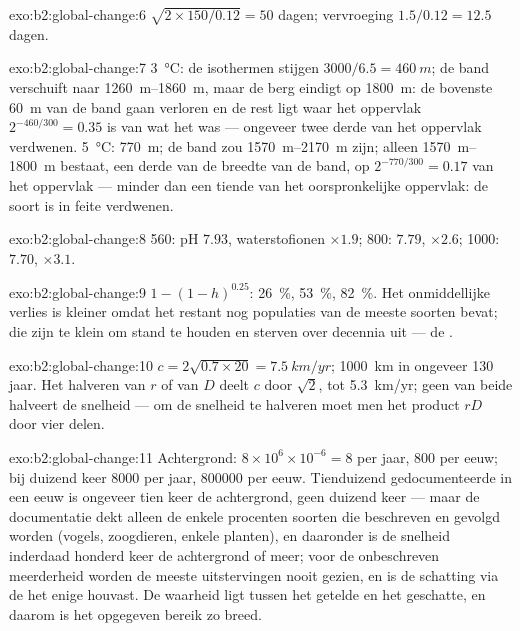 \begin{solution}{exo:b2:global-change:6}
$\sqrt{2\times 150/0.12} = 50$ dagen; vervroeging $1.5/0.12 = 12.5$
dagen.
\end{solution}

\begin{solution}{exo:b2:global-change:7}
\qty{3}{\celsius}: de isothermen stijgen $3000/6.5 = \qty{460}{m}$; de
band verschuift naar \qtyrange{1260}{1860}{m}, maar de berg eindigt op
\qty{1800}{m}: de bovenste \qty{60}{m} van de band gaan verloren en de rest
ligt waar het oppervlak $2^{-460/300} = 0.35$ is van wat het was --- ongeveer
twee derde van het oppervlak verdwenen. \qty{5}{\celsius}: \qty{770}{m}; de
band zou \qtyrange{1570}{2170}{m} zijn; alleen \qtyrange{1570}{1800}{m}
bestaat, een derde van de breedte van de band, op $2^{-770/300} = 0.17$ van het
oppervlak --- minder dan een tiende van het oorspronkelijke oppervlak: de soort
is in feite verdwenen.
\end{solution}

\begin{solution}{exo:b2:global-change:8}
560: pH $7.93$, waterstofionen $\times 1.9$; 800: $7.79$, $\times
2.6$; 1000: $7.70$, $\times 3.1$.
\end{solution}

\begin{solution}{exo:b2:global-change:9}
$1 - (1 - h)^{0.25}$: \qty{26}{\%}, \qty{53}{\%}, \qty{82}{\%}. Het
onmiddellijke verlies is kleiner omdat het restant nog populaties van de
meeste soorten bevat; die zijn te klein om stand te houden en
sterven over decennia uit --- de .
\end{solution}

\begin{solution}{exo:b2:global-change:10}
$c = 2\sqrt{0.7\times 20} = \qty{7.5}{km/yr}$; \qty{1000}{km} in
ongeveer 130 jaar. Het halveren van $r$ of van $D$ deelt $c$ door
$\sqrt 2$, tot \qty{5.3}{km/yr}; geen van beide halveert de snelheid --- om de
snelheid te halveren moet men het product $rD$ door vier delen.
\end{solution}

\begin{solution}{exo:b2:global-change:11}
Achtergrond: $8\times 10^{6}\times 10^{-6} = 8$ per jaar, 800 per
eeuw; bij duizend keer 8000 per jaar, \num{800000} per eeuw.
Tienduizend gedocumenteerde in een eeuw is ongeveer tien keer de
achtergrond, geen duizend keer --- maar de documentatie dekt alleen de
enkele procenten soorten die beschreven en gevolgd worden (vogels,
zoogdieren, enkele planten), en daaronder is de snelheid inderdaad honderd
keer de achtergrond of meer; voor de onbeschreven meerderheid worden de meeste
uitstervingen nooit gezien, en is de schatting via de 
het enige houvast. De waarheid ligt tussen het getelde en het
geschatte, en daarom is het opgegeven bereik zo breed.
\end{solution}

